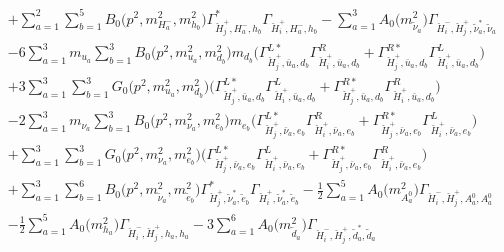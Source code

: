\begin{itemize}
\begin{align}
 &+\sum_{a=1}^{2}\sum_{b=1}^{5}{B_0\Big(p^{2},m^2_{H^-_{{a}}},m^2_{h_{{b}}}\Big)} {\Gamma^*_{\check{H}^+_{{j}},H^-_{{a}},h_{{b}}}} {\Gamma_{\check{H}^+_{{i}},H^-_{{a}},h_{{b}}}} - \sum_{a=1}^{3}{A_0\Big(m^2_{\tilde{\nu}_{{a}}}\Big)} {\Gamma_{\check{H}^-_{{i}},\check{H}^+_{{j}},\tilde{\nu}^*_{{a}},\tilde{\nu}_{{a}}}}  \nonumber \\ 
 &-6 \sum_{a=1}^{3}m_{u_{{a}}} \sum_{b=1}^{3}{B_0\Big(p^{2},m^2_{u_{{a}}},m^2_{d_{{b}}}\Big)} m_{d_{{b}}} \Big({\Gamma^{L*}_{\check{H}^+_{{j}},\bar{u}_{{a}},d_{{b}}}} {\Gamma^R_{\check{H}^+_{{i}},\bar{u}_{{a}},d_{{b}}}}  + {\Gamma^{R*}_{\check{H}^+_{{j}},\bar{u}_{{a}},d_{{b}}}} {\Gamma^L_{\check{H}^+_{{i}},\bar{u}_{{a}},d_{{b}}}} \Big)  \nonumber \\ 
 &+3 \sum_{a=1}^{3}\sum_{b=1}^{3}{G_0\Big(p^{2},m^2_{u_{{a}}},m^2_{d_{{b}}}\Big)} \Big({\Gamma^{L*}_{\check{H}^+_{{j}},\bar{u}_{{a}},d_{{b}}}} {\Gamma^L_{\check{H}^+_{{i}},\bar{u}_{{a}},d_{{b}}}}  + {\Gamma^{R*}_{\check{H}^+_{{j}},\bar{u}_{{a}},d_{{b}}}} {\Gamma^R_{\check{H}^+_{{i}},\bar{u}_{{a}},d_{{b}}}} \Big) \nonumber \\ 
 &-2 \sum_{a=1}^{3}m_{\nu_{{a}}} \sum_{b=1}^{3}{B_0\Big(p^{2},m^2_{\nu_{{a}}},m^2_{e_{{b}}}\Big)} m_{e_{{b}}} \Big({\Gamma^{L*}_{\check{H}^+_{{j}},\bar{\nu}_{{a}},e_{{b}}}} {\Gamma^R_{\check{H}^+_{{i}},\bar{\nu}_{{a}},e_{{b}}}}  + {\Gamma^{R*}_{\check{H}^+_{{j}},\bar{\nu}_{{a}},e_{{b}}}} {\Gamma^L_{\check{H}^+_{{i}},\bar{\nu}_{{a}},e_{{b}}}} \Big)  \nonumber \\ 
 &+\sum_{a=1}^{3}\sum_{b=1}^{3}{G_0\Big(p^{2},m^2_{\nu_{{a}}},m^2_{e_{{b}}}\Big)} \Big({\Gamma^{L*}_{\check{H}^+_{{j}},\bar{\nu}_{{a}},e_{{b}}}} {\Gamma^L_{\check{H}^+_{{i}},\bar{\nu}_{{a}},e_{{b}}}}  + {\Gamma^{R*}_{\check{H}^+_{{j}},\bar{\nu}_{{a}},e_{{b}}}} {\Gamma^R_{\check{H}^+_{{i}},\bar{\nu}_{{a}},e_{{b}}}} \Big)\nonumber \\ 
 &+\sum_{a=1}^{3}\sum_{b=1}^{6}{B_0\Big(p^{2},m^2_{\tilde{\nu}_{{a}}},m^2_{\tilde{e}_{{b}}}\Big)} {\Gamma^*_{\check{H}^+_{{j}},\tilde{\nu}^*_{{a}},\tilde{e}_{{b}}}} {\Gamma_{\check{H}^+_{{i}},\tilde{\nu}^*_{{a}},\tilde{e}_{{b}}}} -\frac{1}{2} \sum_{a=1}^{5}{A_0\Big(m^2_{A^0_{{a}}}\Big)} {\Gamma_{\check{H}^-_{{i}},\check{H}^+_{{j}},A^0_{{a}},A^0_{{a}}}}  \nonumber \\ 
 &-\frac{1}{2} \sum_{a=1}^{5}{A_0\Big(m^2_{h_{{a}}}\Big)} {\Gamma_{\check{H}^-_{{i}},\check{H}^+_{{j}},h_{{a}},h_{{a}}}}  -3 \sum_{a=1}^{6}{A_0\Big(m^2_{\tilde{d}_{{a}}}\Big)} {\Gamma_{\check{H}^-_{{i}},\check{H}^+_{{j}},\tilde{d}^*_{{a}},\tilde{d}_{{a}}}}  \nonumber \\ 

\end{align}
\end{itemize}
